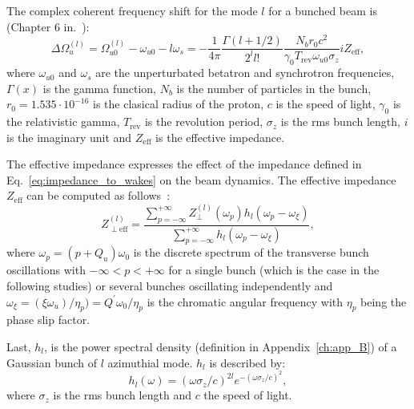 The complex coherent frequency shift for the mode $l$ for a bunched beam is (Chapter 6 in.~\cite{Chao:collective}): %
\begin{equation}\label{eq:complext_tune_shift_modes_m}
    \Delta \Omega_u ^{(l)}= \Omega_{u0}^{(l)}-\omega_{u0}-l\omega_s = -\frac{1}{4\pi}\frac{\Gamma(l+1/2)}{2^l l!}\frac{N_b r_0 c^2}{\gamma_0 T_\mathrm{rev} \omega_{u0} \sigma_z} i Z_\mathrm{eff},
\end{equation}
where $\omega_{u0}$ and $\omega_s$ are the unperturbated betatron and synchrotron frequencies, $\Gamma(x)$ is the gamma function, $N_b$ is the number of particles in the bunch, $r_0=1.535 \cdot 10^{-16}$ is the clasical radius of the proton, $c$ is the speed of light, $\gamma_0$ is the relativistic gamma, $T_\mathrm{rev}$ is the revolution period, $\sigma_z$ is the rms bunch length, $i$ is the imaginary unit and $Z_\mathrm{eff}$ is the effective impedance.


The effective impedance expresses the effect of the impedance defined in Eq.~\eqref{eq:impedance_to_wakes} on the beam dynamics. The effective impedance $Z_\mathrm{eff}$ can be computed as follows~\cite{Chao:collective}:
\begin{equation}\label{eq:effective_impedance}
    Z_{\perp \mathrm{eff}}^{(l)} = \frac{\sum_{p=-\infty}^{+ \infty}Z_{\perp }^{(l)}(\omega_{p}) h_l(\omega_{p}-\omega_\xi)}{\sum_{p=-\infty}^{+ \infty}h_l(\omega_{p}-\omega_\xi)},
\end{equation}
where $\omega_p = (p+Q_u)\omega_0$ is the discrete spectrum of the transverse bunch oscillations with $-\infty < p < + \infty$ for a single bunch (which is the case in the following studies) or several bunches oscillating independently and $\omega_\xi=(\xi \omega_u)/\eta_p) = Q^\prime \omega_0 / \eta_p$ is the chromatic angular frequency with $\eta_p$ being the phase slip factor.

Last, $h_l$, is the power spectral density (definition in Appendix~\ref{ch:app_B}) of a Gaussian bunch of $l$ azimuthial mode. $h_l$ is described by: %
\begin{equation}\label{eq:spectral_density_of_gaussian_bunch}
    h_l(\omega) = (\omega \sigma_z/c)^{2l} e^{-(\omega \sigma_z/c)^2},
\end{equation}
where $\sigma_z$ is the rms bunch length and $c$ the speed of light.

